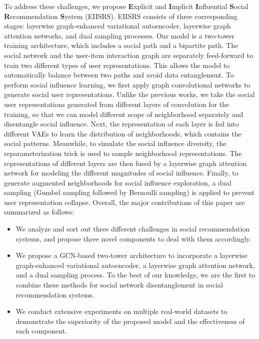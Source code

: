 \documentclass[letterpaper]{article} %
\begin{document}
To address these challenges, we propose \textbf{E}xplicit and \textbf{I}mplicit \textbf{I}nfluential \textbf{S}ocial \textbf{R}ecommendation \textbf{S}ystem (EIISRS). EIISRS consists of three corresponding stages: layerwise graph-enhanced variational autoencoder, layerwise graph attention networks, and dual sampling processes. Our model is a two-tower training architecture, which includes a social path and a bipartite path. The social network and the user-item interaction graph are separately feed-forward to train two different types of user representations. This allows the model to automatically balance between two paths and avoid data entanglement. To perform social influence learning, we first apply graph convolutional networks to generate social user representations. Unlike the previous works, we take the social user representations generated from different layers of convolution for the training, so that we can model different scope of neighborhood separately and disentangle social influence. Next, the representation of each layer is fed into different VAEs to learn the distribution of neighborhoods, which contains the social patterns. Meanwhile, to simulate the social influence diversity, the reparameterization trick is used to sample neighborhood representations. The representations of different layers are then fused by a layerwise graph attention network for modeling the different magnitudes of social influence. Finally, to generate augmented neighborhoods for social influence exploration, a dual sampling (Gumbel sampling followed by Bernoulli sampling) is applied to prevent user representation collapse. Overall, the major contributions of this paper are summarized as follows:

\begin{itemize}
    \item We analyze and sort out three different challenges in social recommendation systems, and propose three novel components to deal with them accordingly.
    \item We propose a GCN-based two-tower architecture to incorporate a layerwise graph-enhanced variational autoencoder, a layerwise graph attention network, and a dual sampling process. To the best of our knowledge, we are the first to combine these methods for social network disentanglement in social recommendation systems. 
    \item We conduct extensive experiments on multiple real-world datasets to demonstrate the superiority of the proposed model and the effectiveness of each component. 
\end{itemize}
\end{document}
